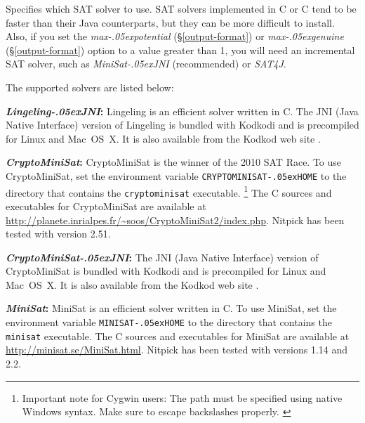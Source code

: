 \documentclass[a4paper,12pt]{article}
\renewcommand\_{\hbox{\textunderscore\kern-.05ex}}
\begin{document}
\def\cpp{C\nobreak\raisebox{.1ex}{+}\nobreak\raisebox{.1ex}{+}}

\sloppy

\begin{enum}
\opdefault{sat\_solver}{string}{smart}
Specifies which SAT solver to use. SAT solvers implemented in C or \cpp{} tend
to be faster than their Java counterparts, but they can be more difficult to
install. Also, if you set the \textit{max\_potential} (\S\ref{output-format}) or
\textit{max\_genuine} (\S\ref{output-format}) option to a value greater than 1,
you will need an incremental SAT solver, such as \textit{MiniSat\_JNI}
(recommended) or \textit{SAT4J}.

The supported solvers are listed below:

\begin{enum}

\item[\labelitemi] \textbf{\textit{Lingeling\_JNI}:}
Lingeling is an efficient solver written in C. The JNI (Java Native Interface)
version of Lingeling is bundled with Kodkodi and is precompiled for Linux and
Mac~OS~X. It is also available from the Kodkod web site \cite{kodkod-2009}.

\item[\labelitemi] \textbf{\textit{CryptoMiniSat}:} CryptoMiniSat is the winner of
the 2010 SAT Race. To use CryptoMiniSat, set the environment variable
\texttt{CRYPTO\-MINISAT\_}\discretionary{}{}{}\texttt{HOME} to the directory that contains the \texttt{crypto\-minisat}
executable.%
\footnote{Important note for Cygwin users: The path must be specified using
native Windows syntax. Make sure to escape backslashes properly.%
\label{cygwin-paths}}
The \cpp{} sources and executables for Crypto\-Mini\-Sat are available at
\url{http://planete.inrialpes.fr/~soos/}\allowbreak\url{CryptoMiniSat2/index.php}.
Nitpick has been tested with version 2.51.

\item[\labelitemi] \textbf{\textit{CryptoMiniSat\_JNI}:} The JNI (Java Native
Interface) version of CryptoMiniSat is bundled with Kodkodi and is precompiled
for Linux and Mac~OS~X. It is also available from the Kodkod web site
\cite{kodkod-2009}.

\item[\labelitemi] \textbf{\textit{MiniSat}:} MiniSat is an efficient solver
written in \cpp{}. To use MiniSat, set the environment variable
\texttt{MINISAT\_HOME} to the directory that contains the \texttt{minisat}
executable.%
The \cpp{} sources and executables for MiniSat are available at
\url{http://minisat.se/MiniSat.html}. Nitpick has been tested with versions 1.14
and 2.2.


\end{enum}
\end{enum}
\end{document}
